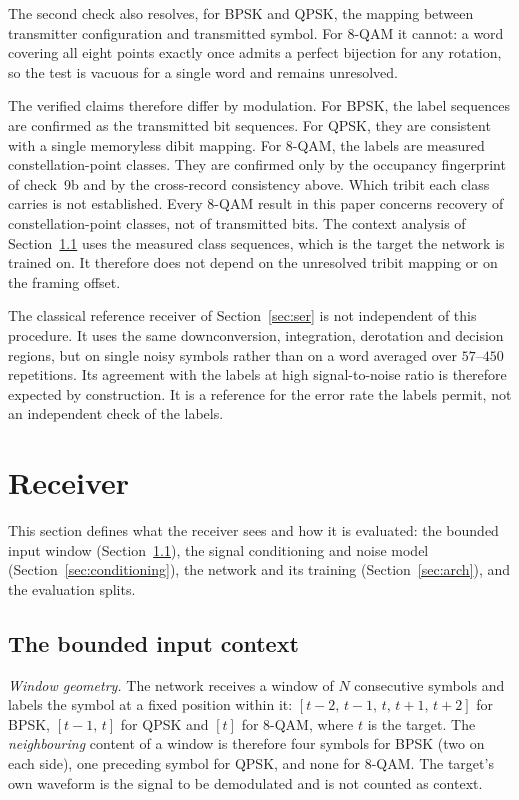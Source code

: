 \documentclass{ieeeaccess}
\begin{document}
The second check also resolves, for BPSK and QPSK, the mapping between
transmitter configuration and transmitted symbol. For 8-QAM it cannot: a word
covering all eight points exactly once admits a perfect bijection for any
rotation, so the test is vacuous for a single word and remains unresolved.

The verified claims therefore differ by modulation. For BPSK, the label
sequences are confirmed as the transmitted bit sequences. For QPSK, they are
consistent with a single memoryless dibit mapping. For 8-QAM, the labels are
measured constellation-point classes. They are confirmed only by the
occupancy fingerprint of check~9b and by the cross-record consistency above.
Which tribit each class carries is not established. Every 8-QAM result in this
paper concerns recovery of constellation-point classes, not of transmitted bits.
The context analysis of Section~\ref{sec:bound} uses the measured class
sequences, which is the target the network is trained on. It therefore does
not depend on the unresolved tribit mapping or on the framing offset.

The classical reference receiver of Section~\ref{sec:ser} is not independent of
this procedure. It uses the same downconversion, integration, derotation and
decision regions, but on single noisy symbols rather than on a word averaged
over $57$--$450$ repetitions. Its agreement with the labels at high
signal-to-noise ratio is therefore expected by construction. It is a reference
for the error rate the labels permit, not an independent check of the labels.

\section{Receiver}

This section defines what the receiver sees and how it is evaluated: the
bounded input window (Section~\ref{sec:bound}), the signal conditioning and
noise model (Section~\ref{sec:conditioning}), the network and its training
(Section~\ref{sec:arch}), and the evaluation splits.

\subsection{The bounded input context}
\label{sec:bound}
\emph{Window geometry.} The network receives a window of $N$ consecutive
symbols and labels the symbol at a fixed position within it:
$[t{-}2,\,t{-}1,\,t,\,t{+}1,\,t{+}2]$ for BPSK, $[t{-}1,\,t]$ for QPSK and
$[t]$ for 8-QAM, where $t$ is the target. The \emph{neighbouring} content of a
window is therefore four symbols for BPSK (two on each side), one preceding
symbol for QPSK, and none for 8-QAM. The target's own waveform is the signal to
be demodulated and is not counted as context.
\end{document}

